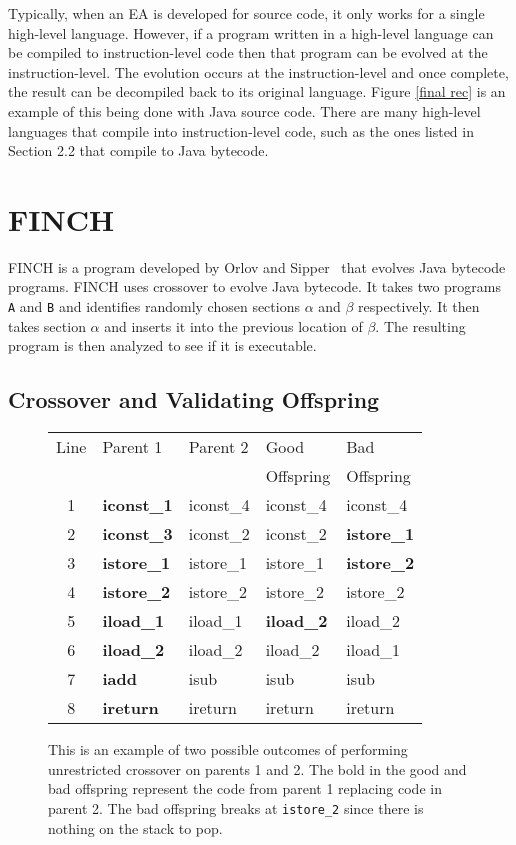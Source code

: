 \documentclass{sig-alternate}
\begin{document}
Typically, when an EA is developed for source code, it only works for a single high-level language. However, if a program written in a high-level language can be compiled to instruction-level code then that program can be evolved at the instruction-level. The evolution occurs at the instruction-level and once complete, the result can be decompiled back to its original language. Figure \ref{final rec} is an example of this being done with Java source code. There are many high-level languages that compile into instruction-level code, such as the ones listed in Section 2.2 that compile to Java bytecode.


\section{FINCH}
FINCH is a program developed by Orlov and Sipper~\cite{FINCH2:2009,FINCH:2011} that evolves Java bytecode programs. FINCH uses crossover to evolve Java bytecode. It takes two programs \texttt{A} and \texttt{B} and identifies randomly chosen sections $\alpha$ and $\beta$ respectively. It then takes section $\alpha$ and inserts it into the previous location of $\beta$. The resulting program is then analyzed to see if it is executable.

\subsection{Crossover and Validating Offspring}

\begin{figure}
\begin{tabular}{|c|l|l|l|l|}

\hline
Line&Parent 1&Parent 2&Good&Bad\\  
 &         &         &Offspring&Offspring\\ \hline
1&\textbf{iconst\_1}&iconst\_4&iconst\_4&iconst\_4\\
2&\textbf{iconst\_3}&iconst\_2&iconst\_2&\textbf{istore\_1}\\
3&\textbf{istore\_1}&istore\_1&istore\_1&\textbf{istore\_2}\\
4&\textbf{istore\_2}&istore\_2&istore\_2&istore\_2\\
5&\textbf{iload\_1}&iload\_1&\textbf{iload\_2}&iload\_2\\
6&\textbf{iload\_2}&iload\_2&iload\_2&iload\_1\\
7&\textbf{iadd}&isub&isub&isub\\
8&\textbf{ireturn}&ireturn&ireturn&ireturn\\
\hline
\end{tabular}
\caption{This is an example of two possible outcomes of performing unrestricted crossover on parents 1 and 2. The bold in the good and bad offspring represent the code from parent 1 replacing code in parent 2. The bad offspring breaks at \texttt{istore\_2} since there is nothing on the stack to pop.}
\label{crossover}
  
\end{figure}
\end{document}
